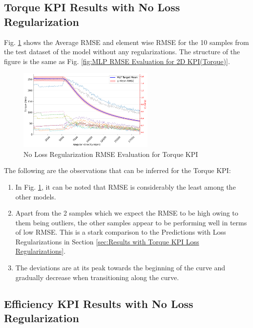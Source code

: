 \documentclass{report} %
\begin{document}
\subsection{Torque KPI Results with No Loss Regularization}\label{subsec:Torque KPI Results with No Loss Regularization}

Fig. \ref{fig:No Loss Regularization RMSE Evaluation for 2D KPI(Torque)} shows the Average \ac{RMSE} and element wise \ac{RMSE} for the 10 samples from the test dataset 
of the model without any regularizations. The structure of the figure is the same as Fig. \ref{fig:MLP RMSE Evaluation for 2D KPI(Torque)}.\\

\begin{figure}[H]
    \centering
    \includegraphics[width=0.6\textwidth]{./ReportImages/RMSE_MLP_no_lossreg_y1.png} 
    \caption{No Loss Regularization \ac{RMSE} Evaluation for Torque \ac{KPI}} 
    \label{fig:No Loss Regularization RMSE Evaluation for 2D KPI(Torque)}
\end{figure}

The following are the observations that can be inferred for the Torque \ac{KPI}:
\begin{enumerate}[nosep]
    \item In Fig. \ref{fig:No Loss Regularization RMSE Evaluation for 2D KPI(Torque)}, it can be noted that \ac{RMSE} is considerably the least among the other models.
    \item Apart from the 2 samples which we expect the \ac{RMSE} to be high owing to them being outliers, the other samples appear to be performing well in terms 
    of low \ac{RMSE}. This is a stark comparison to the Predictions with Loss Regularizations in Section \ref{sec:Results with Torque KPI Loss Regularizations}.
    \item The deviations are at its peak towards the beginning of the curve and gradually decrease when transitioning along the curve.
\end{enumerate}

\subsection{Efficiency KPI Results with No Loss Regularization}\label{subsec:Efficiency Results with No Loss Regularization}
\end{document}
